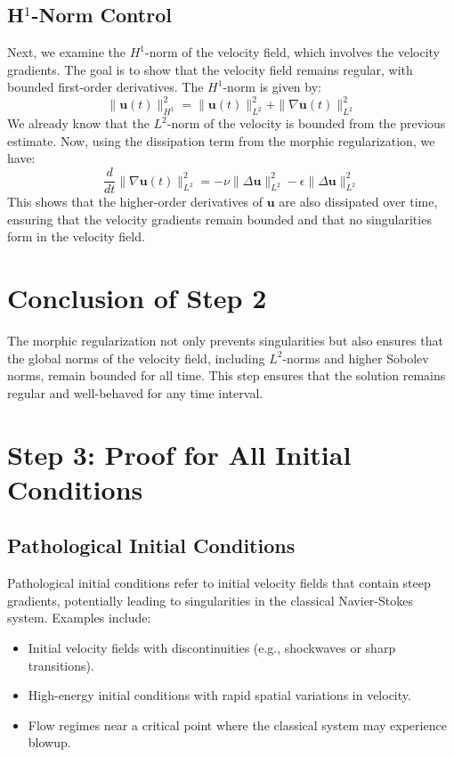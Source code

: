\documentclass{article}
\begin{document}
\subsection*{H\(^1\)-Norm Control}

Next, we examine the \( H^1 \)-norm of the velocity field, which involves the velocity gradients. The goal is to show that the velocity field remains regular, with bounded first-order derivatives. The \( H^1 \)-norm is given by:
\[
\|\mathbf{u}(t)\|_{H^1}^2 = \|\mathbf{u}(t)\|_{L^2}^2 + \|\nabla \mathbf{u}(t)\|_{L^2}^2
\]
We already know that the \( L^2 \)-norm of the velocity is bounded from the previous estimate. Now, using the dissipation term from the morphic regularization, we have:
\[
\frac{d}{dt} \|\nabla \mathbf{u}(t)\|_{L^2}^2 = -\nu \|\Delta \mathbf{u}\|_{L^2}^2 - \epsilon \|\Delta \mathbf{u}\|_{L^2}^2
\]
This shows that the higher-order derivatives of \( \mathbf{u} \) are also dissipated over time, ensuring that the velocity gradients remain bounded and that no singularities form in the velocity field.

\section*{Conclusion of Step 2}

The morphic regularization not only prevents singularities but also ensures that the global norms of the velocity field, including \( L^2 \)-norms and higher Sobolev norms, remain bounded for all time. This step ensures that the solution remains regular and well-behaved for any time interval.
\\

\section*{Step 3: Proof for All Initial Conditions}

\subsection*{Pathological Initial Conditions}

Pathological initial conditions refer to initial velocity fields that contain steep gradients, potentially leading to singularities in the classical Navier-Stokes system. Examples include:
\begin{itemize}
    \item Initial velocity fields with discontinuities (e.g., shockwaves or sharp transitions).
    \item High-energy initial conditions with rapid spatial variations in velocity.
    \item Flow regimes near a critical point where the classical system may experience blowup.
\end{itemize}
\end{document}

